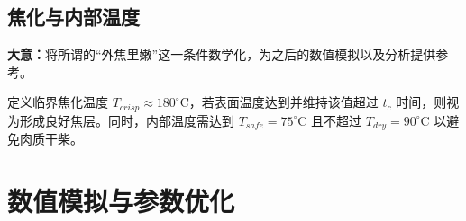 \documentclass[12pt]{article}
\begin{document}
\subsection{焦化与内部温度}
\begin{summarybox}
	\textbf{大意：}将所谓的“外焦里嫩”这一条件数学化，为之后的数值模拟以及分析提供参考。
\end{summarybox}
\par 定义临界焦化温度 $T_{crisp} \approx 180^\circ$C，若表面温度达到并维持该值超过 $t_c$ 时间，则视为形成良好焦层。同时，内部温度需达到 $T_{safe} = 75^\circ$C 且不超过 $T_{dry} = 90^\circ$C 以避免肉质干柴。

\section{数值模拟与参数优化}
\end{document}
